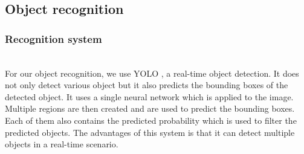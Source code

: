 \documentclass[runningheads,a4paper]{llncs}
\begin{document}
\subsection{Object recognition}
\subsubsection{Recognition system}
\hfill\\

For our object recognition, we use YOLO \cite{yolo}, a real-time object detection. It does not only detect various object but it also predicts the bounding boxes of the detected object. It uses a single neural network which is applied to the image. Multiple regions are then created and are used to predict the bounding boxes. Each of them also contains the predicted probability which is used to filter the predicted objects. The advantages of this system is that it can detect multiple objects in a real-time scenario.\\
\end{document}
